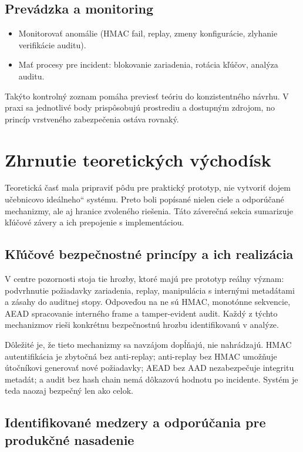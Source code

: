 \documentclass[journal,a4paper,onecolumn]{IEEEtran}
\newcommand{\uv}[1]{\quotedblbase#1\textquotedblleft}
\begin{document}
\subsection{Prevádzka a monitoring}

\begin{itemize}[leftmargin=*,itemsep=2pt]
  \item Monitorovať anomálie (HMAC fail, replay, zmeny konfigurácie, zlyhanie verifikácie auditu).
  \item Mať procesy pre incident: blokovanie zariadenia, rotácia kľúčov, analýza auditu.
\end{itemize}

Takýto kontrolný zoznam pomáha previesť teóriu do konzistentného návrhu. V praxi sa jednotlivé body prispôsobujú prostrediu a dostupným zdrojom, no princíp vrstveného zabezpečenia ostáva rovnaký.

\section{Zhrnutie teoretických východísk}

Teoretická časť mala pripraviť pôdu pre praktický prototyp, nie vytvoriť dojem \uv{učebnicovo ideálneho} systému. Preto boli popísané nielen ciele a odporúčané mechanizmy, ale aj hranice zvoleného riešenia. Táto záverečná sekcia sumarizuje kľúčové závery a ich prepojenie s implementáciou.

\subsection{Kľúčové bezpečnostné princípy a ich realizácia}

V centre pozornosti stoja tie hrozby, ktoré majú pre prototyp reálny význam: podvrhnutie požiadavky zariadenia, replay, manipulácia s internými metadátami a zásahy do auditnej stopy. Odpoveďou na ne sú HMAC, monotónne sekvencie, AEAD spracovanie interného frame a tamper-evident audit. Každý z týchto mechanizmov rieši konkrétnu bezpečnostnú hrozbu identifikovanú v analýze.

Dôležité je, že tieto mechanizmy sa navzájom dopĺňajú, nie nahrádzajú. HMAC autentifikácia je zbytočná bez anti-replay; anti-replay bez HMAC umožňuje útočníkovi generovať nové požiadavky; AEAD bez AAD nezabezpečuje integritu metadát; a audit bez hash chain nemá dôkazovú hodnotu po incidente. Systém je teda naozaj bezpečný len ako celok.

\subsection{Identifikované medzery a odporúčania pre produkčné nasadenie}
\end{document}
